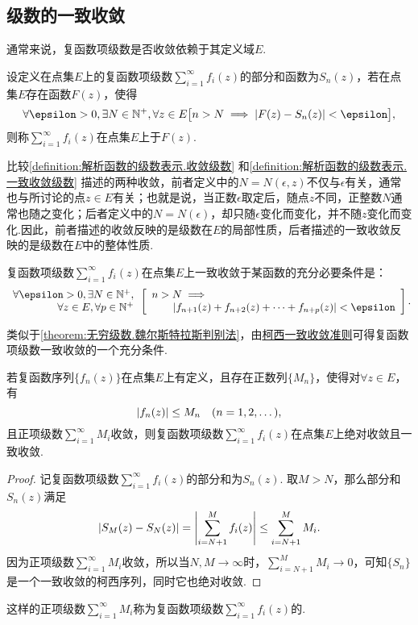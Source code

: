 \subsection{级数的一致收敛}
通常来说，复函数项级数是否收敛依赖于其定义域\(E\).
\begin{definition}\label{definition:解析函数的级数表示.一致收敛级数}
设定义在点集\(E\)上的复函数项级数\(\sum_{i=1}^\infty f_i(z)\)的部分和函数为\(S_n(z)\)，若在点集\(E\)存在函数\(F(z)\)，使得\[
\forall\epsilon>0,
\exists N \in \mathbb{N}^+,
\forall z \in E
\bigl[
	n>N \implies \abs{F(z) - S_n(z)} < \epsilon
\bigr],
\]则称\(\sum_{i=1}^\infty f_i(z)\)在点集\(E\)上于\(F(z)\).
\end{definition}

比较\cref{definition:解析函数的级数表示.收敛级数} 和\cref{definition:解析函数的级数表示.一致收敛级数} 描述的两种收敛，前者定义中的\(N = N(\epsilon, z)\)不仅与\(\epsilon\)有关，通常也与所讨论的点\(z \in E\)有关；也就是说，当正数\(\epsilon\)取定后，随点\(z\)不同，正整数\(N\)通常也随之变化；后者定义中的\(N = N(\epsilon)\)，却只随\(\epsilon\)变化而变化，并不随\(z\)变化而变化.因此，前者描述的收敛反映的是级数在\(E\)的局部性质，后者描述的一致收敛反映的是级数在\(E\)中的整体性质.

\begin{theorem}[柯西一致收敛准则]\label{theorem:无穷级数.柯西一致收敛准则}
复函数项级数\(\sum_{i=1}^\infty f_i(z)\)在点集\(E\)上一致收敛于某函数的充分必要条件是：\[
\begin{array}{r}
\forall\epsilon>0,
\exists N \in \mathbb{N}^+, \\
\forall z \in E,
\forall p \in \mathbb{N}^+
\end{array}
\left[
\begin{array}{l}
n > N \implies \\
\hspace{20pt}
\abs{f_{n+1}(z) + f_{n+2}(z) + \dotsb + f_{n+p}(z)} < \epsilon
\end{array}
\right].
\]
\end{theorem}

类似于\cref{theorem:无穷级数.魏尔斯特拉斯判别法}，由\hyperref[theorem:无穷级数.柯西一致收敛准则]{柯西一致收敛准则}可得复函数项级数一致收敛的一个充分条件.
\begin{corollary}\label{theorem:无穷级数.优级数准则}
若复函数序列\(\{f_n(z)\}\)在点集\(E\)上有定义，且存在正数列\(\{M_n\}\)，使得对\(\forall z \in E\)，有\[
\abs{f_n(z)} \leq M_n
\quad(n=1,2,\dotsc),
\]且正项级数\(\sum_{i=1}^\infty M_i\)收敛，则复函数项级数\(\sum_{i=1}^\infty f_i(z)\)在点集\(E\)上绝对收敛且一致收敛.
\begin{proof}
记复函数项级数\(\sum_{i=1}^\infty f_i(z)\)的部分和为\(S_n(z)\).
取\(M > N\)，那么部分和\(S_n(z)\)满足\[
\abs{S_M(z) - S_N(z)}
= \abs{\sum_{i=N+1}^M f_i(z)}
\leq \sum_{i=N+1}^M M_i.
\]因为正项级数\(\sum_{i=1}^\infty M_i\)收敛，所以当\(N,M \to \infty\)时，\(\sum_{i=N+1}^M M_i \to 0\)，可知\(\{S_n\}\)是一个一致收敛的柯西序列，同时它也绝对收敛.
\end{proof}
\end{corollary}
这样的正项级数\(\sum_{i=1}^\infty M_i\)称为复函数项级数\(\sum_{i=1}^\infty f_i(z)\)的.


